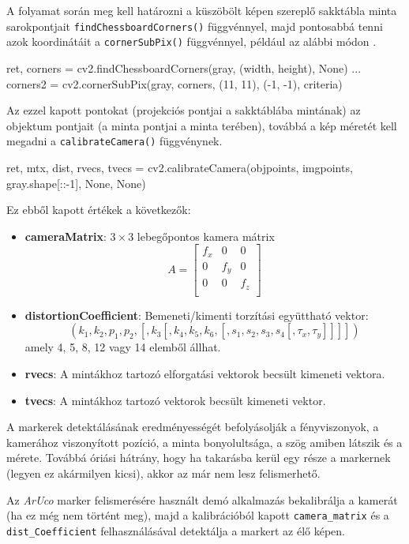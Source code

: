 A folyamat során meg kell határozni a küszöbölt képen szereplő sakktábla minta sarokpontjait
\texttt{findChessboardCorners()} függvénnyel, majd pontosabbá tenni azok koordinátáit a
\texttt{cornerSubPix()} függvénnyel, például az alábbi módon \cite{opencvcalib}.
\begin{python}
ret, corners = cv2.findChessboardCorners(gray, (width, height), None)
...
corners2 = cv2.cornerSubPix(gray, corners, (11, 11), (-1, -1), criteria)
\end{python}
Az ezzel kapott pontokat (projekciós pontjai a sakktáblába mintának) az objektum pontjait (a minta pontjai a minta terében), továbbá a kép méretét kell megadni a \texttt{calibrateCamera()} függvénynek.
\begin{python}
ret, mtx, dist, rvecs, tvecs = cv2.calibrateCamera(objpoints,
  imgpoints, gray.shape[::-1], None, None)
\end{python}
Ez ebből kapott értékek a következők:
\begin{itemize}
\item {\bf cameraMatrix}: $3 \times 3$ lebegőpontos kamera mátrix
\[
A =
\begin{bmatrix}
	f_x & 0 & 0 \\
	0 & f_y & 0 \\
	0 & 0 & f_z \\
\end{bmatrix}
\]

\item {\bf distortionCoefficient}: Bemeneti/kimenti torzítási együttható vektor:
\[
(k_1, k_2, p_1, p_2, [, k_3 [, k_4, k_5, k_6, [, s_1, s_2, s_3, s_4 [, \tau_x, \tau_y]]]])
\]
amely 4, 5, 8, 12 vagy 14 elemből állhat.

\item {\bf rvecs}: A mintákhoz tartozó elforgatási vektorok becsült kimeneti vektora.

\item {\bf tvecs}: A mintákhoz tartozó vektorok becsült kimeneti vektor.
\end{itemize}


A markerek detektálásának eredményességét befolyásolják a fényviszonyok, a kamerához viszonyított pozíció, a minta bonyolultsága, a szög amiben látszik és a mérete. Továbbá óriási hátrány, hogy ha takarásba kerül egy része a markernek (legyen ez akármilyen kicsi), akkor az már nem lesz felismerhető.

Az \textit{ArUco} marker felismerésére használt demó alkalmazás bekalibrálja a kamerát (ha ez még nem történt meg), majd a kalibrációból kapott \texttt{camera\_matrix} és a \texttt{dist\_Coefficient} felhasználásával detektálja a markert az élő képen.

